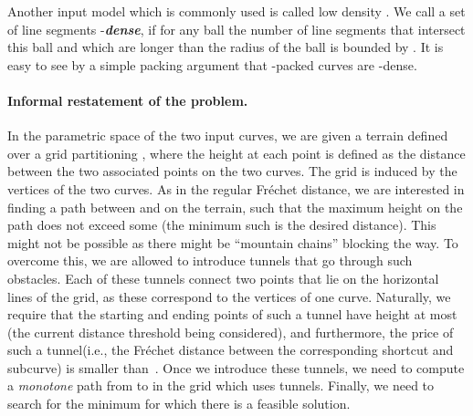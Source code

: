 \documentclass[12pt]{article}
\newcommand{\emphic}[2]{\textcolor{blue25}{\textbf{\emph{#1}}}\index{#2}}
\newcommand{\emphi}[1]{\emphic{#1}{#1}}
\newcommand{\Frechet}{Fr\'{e}c{h}e{}t\xspace}\providecommand{\Arr}{\mathop{\mathrm{\EuScript{A}}}}
\newcommand{\tunnel}{tunnel\xspace}
\newcommand{\tunnels}{tunnels\xspace}
\numberwithin{figure}{section}
\numberwithin{equation}{section}
\begin{document}
Another input model which is commonly used is called low density
\cite{bksv-rimga-02}.  We call a set of line segments
-\emphi{dense}, if for any ball the number of line segments that
intersect this ball and which are longer than the radius of the ball
is bounded by . It is easy to see by a simple packing argument
that -packed curves are -dense.



\paragraph{Informal restatement of the problem.} 

In the parametric space of the two input curves, we are given a
terrain defined over a grid partitioning , where the height
at each point is defined as the distance between the two associated
points on the two curves. The grid is induced by the vertices of the
two curves. As in the regular \Frechet distance, we are interested in
finding a path between  and  on the terrain, such that
the maximum height on the path does not exceed some  (the
minimum such  is the desired distance). This might not be
possible as there might be ``mountain chains'' blocking the way.  To
overcome this, we are allowed to introduce \tunnels that go through
such obstacles. Each of these \tunnels connect two points that lie on
the horizontal lines of the grid, as these correspond to the vertices
of one curve. Naturally, we require that the starting and ending
points of such a \tunnel have height at most  (the current
distance threshold being considered), and furthermore, the price of
such a \tunnel (i.e., the \Frechet distance between the corresponding
shortcut and subcurve) is smaller than~. Once we introduce
these \tunnels, we need to compute a \emph{monotone} path from 
to  in the grid which uses \tunnels.  Finally, we need to
search for the minimum  for which there is a feasible
solution.
\end{document}

